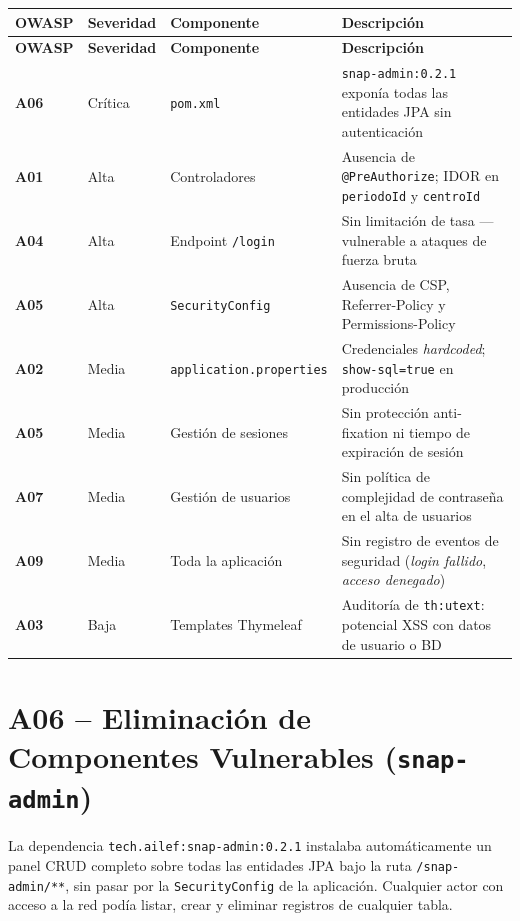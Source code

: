 \documentclass[12pt, a4paper]{report}
\begin{document}
{\small
\begin{longtable}{>{\bfseries}p{1.4cm} p{1.6cm} p{4.0cm} p{5.0cm}}
  \toprule
  \textbf{OWASP} & \textbf{Severidad} & \textbf{Componente} & \textbf{Descripción} \\
  \midrule
  \endfirsthead
  \toprule
  \textbf{OWASP} & \textbf{Severidad} & \textbf{Componente} & \textbf{Descripción} \\
  \midrule
  \endhead
  \bottomrule
  \endfoot
  A06 & Crítica & \texttt{pom.xml} & \texttt{snap-admin:0.2.1} exponía todas las entidades JPA sin autenticación \\[4pt]
  A01 & Alta & Controladores & Ausencia de \texttt{@PreAuthorize}; IDOR en \texttt{periodoId} y \texttt{centroId} \\[4pt]
  A04 & Alta & Endpoint \texttt{/login} & Sin limitación de tasa --- vulnerable a ataques de fuerza bruta \\[4pt]
  A05 & Alta & \texttt{SecurityConfig} & Ausencia de CSP, Referrer-Policy y Permissions-Policy \\[4pt]
  A02 & Media & \texttt{application.properties} & Credenciales \textit{hardcoded}; \texttt{show-sql=true} en producción \\[4pt]
  A05 & Media & Gestión de sesiones & Sin protección anti-fixation ni tiempo de expiración de sesión \\[4pt]
  A07 & Media & Gestión de usuarios & Sin política de complejidad de contraseña en el alta de usuarios \\[4pt]
  A09 & Media & Toda la aplicación & Sin registro de eventos de seguridad (\textit{login fallido}, \textit{acceso denegado}) \\[4pt]
  A03 & Baja & Templates Thymeleaf & Auditoría de \texttt{th:utext}: potencial XSS con datos de usuario o BD \\
\end{longtable}
}

\section{A06 -- Eliminación de Componentes Vulnerables (\texttt{snap-admin})}

La dependencia \texttt{tech.ailef:snap-admin:0.2.1} instalaba automáticamente un panel CRUD completo sobre todas las entidades JPA bajo la ruta \texttt{/snap-admin/**}, sin pasar por la \texttt{SecurityConfig} de la aplicación. Cualquier actor con acceso a la red podía listar, crear y eliminar registros de cualquier tabla.
\end{document}
